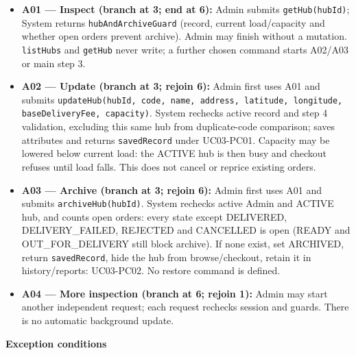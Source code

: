 \begin{itemize}
\item \textbf{A01 --- Inspect (branch at 3; end at 6):} Admin submits \texttt{getHub(hubId)}; System returns \texttt{hubAndArchiveGuard} (record, current load/capacity and whether open orders prevent archive). Admin may finish without a mutation. \texttt{listHubs} and \texttt{getHub} never write; a further chosen command starts A02/A03 or main step 3.

\item \textbf{A02 --- Update (branch at 3; rejoin 6):} Admin first uses A01 and submits \texttt{updateHub(hubId, code, name, address, latitude, longitude, baseDeliveryFee, capacity)}. System rechecks active record and step 4 validation, excluding this same hub from duplicate-code comparison; saves attributes and returns \texttt{savedRecord} under UC03-PC01. Capacity may be lowered below current load: the ACTIVE hub is then busy and checkout refuses until load falls. This does not cancel or reprice existing orders.

\item \textbf{A03 --- Archive (branch at 3; rejoin 6):} Admin first uses A01 and submits \texttt{archiveHub(hubId)}. System rechecks active Admin and ACTIVE hub, and counts open orders: every state except DELIVERED, DELIVERY\_FAILED, REJECTED and CANCELLED is open (READY and OUT\_FOR\_DELIVERY still block archive). If none exist, set ARCHIVED, return \texttt{savedRecord}, hide the hub from browse/checkout, retain it in history/reports: UC03-PC02. No restore command is defined.

\item \textbf{A04 --- More inspection (branch at 6; rejoin 1):} Admin may start another independent request; each request rechecks session and guards. There is no automatic background update.

\end{itemize}
\textbf{Exception conditions}

